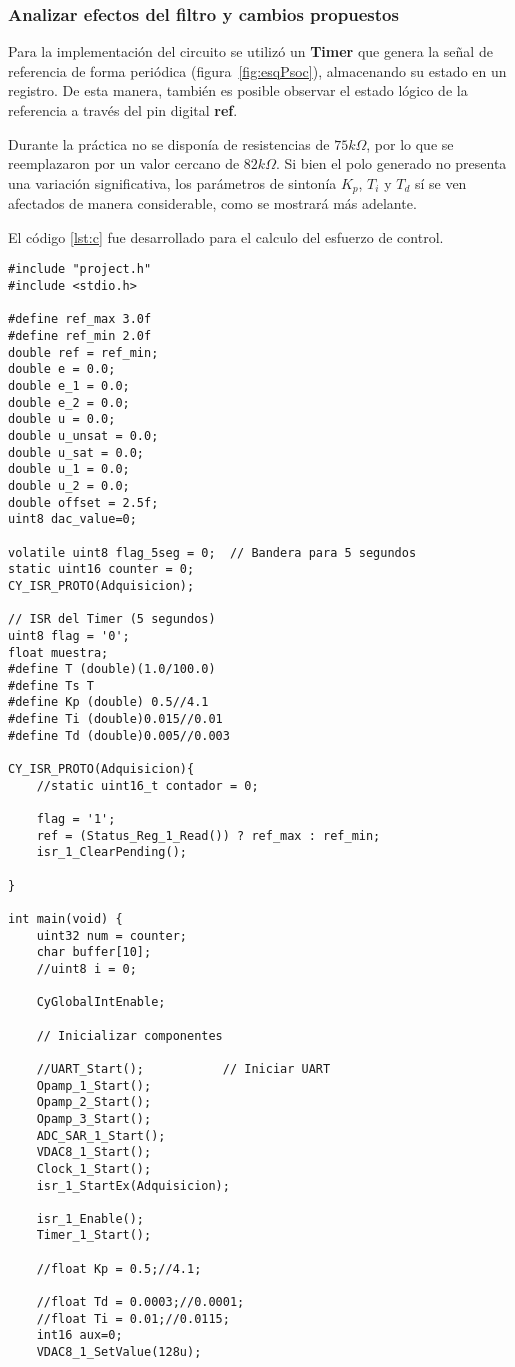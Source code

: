 
\subsubsection{Analizar efectos del filtro y cambios propuestos}
Para la implementación del circuito se utilizó un \textbf{Timer} que genera la señal de referencia de forma periódica (figura~\ref{fig:esqPsoc}), almacenando su estado en un registro. De esta manera, también es posible observar el estado lógico de la referencia a través del pin digital \textbf{ref}.  

Durante la práctica no se disponía de resistencias de \(75k\Omega\), por lo que se reemplazaron por un valor cercano de \(82k\Omega\). Si bien el polo generado no presenta una variación significativa, los parámetros de sintonía $K_p$, $T_i$ y $T_d$ sí se ven afectados de manera considerable, como se mostrará más adelante.

El código \ref{lst:c} fue desarrollado para el calculo del esfuerzo de control.
\onecolumn
\begin{minipage}{0.98\textwidth}
	\begin{lstlisting}[style=cstyle]
#include "project.h"
#include <stdio.h>

#define ref_max 3.0f
#define ref_min 2.0f
double ref = ref_min;
double e = 0.0;
double e_1 = 0.0;
double e_2 = 0.0;
double u = 0.0;
double u_unsat = 0.0;
double u_sat = 0.0;
double u_1 = 0.0;
double u_2 = 0.0;
double offset = 2.5f; 
uint8 dac_value=0;

volatile uint8 flag_5seg = 0;  // Bandera para 5 segundos
static uint16 counter = 0;
CY_ISR_PROTO(Adquisicion);

// ISR del Timer (5 segundos)
uint8 flag = '0';
float muestra;
#define T (double)(1.0/100.0)
#define Ts T
#define Kp (double) 0.5//4.1
#define Ti (double)0.015//0.01
#define Td (double)0.005//0.003

CY_ISR_PROTO(Adquisicion){
	//static uint16_t contador = 0;
	
	flag = '1';
	ref = (Status_Reg_1_Read()) ? ref_max : ref_min;
	isr_1_ClearPending();
	
}

int main(void) {
	uint32 num = counter;
	char buffer[10];
	//uint8 i = 0;
	
	CyGlobalIntEnable;
	
	// Inicializar componentes
	
	//UART_Start();           // Iniciar UART
	Opamp_1_Start();
	Opamp_2_Start();
	Opamp_3_Start();
	ADC_SAR_1_Start();
	VDAC8_1_Start();
	Clock_1_Start();
	isr_1_StartEx(Adquisicion);
	
	isr_1_Enable();
	Timer_1_Start();
	
	//float Kp = 0.5;//4.1;
	
	//float Td = 0.0003;//0.0001;
	//float Ti = 0.01;//0.0115;
	int16 aux=0;
	VDAC8_1_SetValue(128u);
\end{lstlisting}
\end{minipage}



